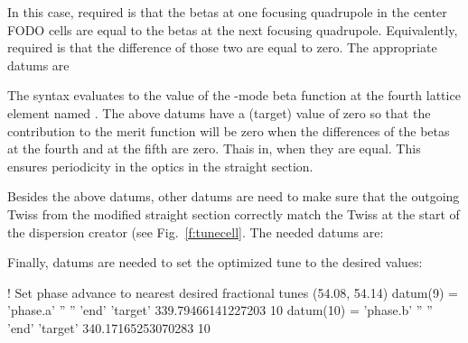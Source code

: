 \documentclass{hitec}     %
\begin{document}
{In this case, required is that the betas at one focusing quadrupole in the center FODO cells are equal to the betas at the next focusing quadrupole. Equivalently, required is that the difference of those two are equal to zero.
The appropriate datums are 

The syntax  evaluates to the value of the -mode beta function at the fourth lattice element named .
The above datums have a  (target) value of zero so that the contribution to the merit function
will be zero when the differences of the betas at the fourth  and at the fifth  are zero.
Thais in, when they are equal. This ensures periodicity in the optics in the straight section.

Besides the above datums, other datums are need to make sure that the outgoing Twiss from the modified straight section correctly match the Twiss at the start of the dispersion creator  (see Fig.~\ref{f:tunecell}. The needed datums are:

Finally, datums are needed to set the optimized tune to the desired values:
\begin{code}
! Set phase advance to nearest desired fractional tunes (54.08, 54.14)
datum(9) = 'phase.a' '' '' 'end' 'target' 339.79466141227203 10
datum(10) = 'phase.b' '' '' 'end' 'target' 340.17165253070283 10
\end{code}

}
\end{document}
